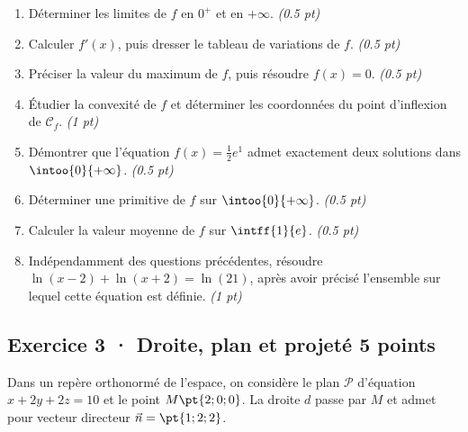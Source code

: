 \begin{enumerate}

\item Déterminer les limites de $f$ en $0^+$ et en $+\infty$. \hfill\textit{(\num{0,5} pt)}

\item Calculer $f' (x)$, puis dresser le tableau de variations de $f$. \hfill\textit{(\num{0,5} pt)}

\item Préciser la valeur du maximum de $f$, puis résoudre $f(x)=0$. \hfill\textit{(\num{0,5} pt)}

\item Étudier la convexité de $f$ et déterminer les coordonnées du point d'inflexion de $\mathcal C_f$. \hfill\textit{(1 pt)}

\item Démontrer que l'équation $f(x)=\frac12 e^{1}$ admet exactement deux solutions dans $\intoo{0}{+\infty}$. \hfill\textit{(\num{0,5} pt)}

\item Déterminer une primitive de $f$ sur $\intoo{0}{+\infty}$. \hfill\textit{(\num{0,5} pt)}

\item Calculer la valeur moyenne de $f$ sur $\intff{1}{e}$. \hfill\textit{(\num{0,5} pt)}

\item Indépendamment des questions précédentes, résoudre $\ln(x-2)+\ln(x+2)=\ln(21)$, après avoir précisé l'ensemble sur lequel cette équation est définie. \hfill\textit{(1 pt)}

\end{enumerate}

\mxnewpage{}

\subsection*{Exercice 3 · Droite, plan et projeté \hfill 5 points}Dans un repère orthonormé de l'espace, on considère le plan $\mathcal P$ d'équation $x+2y+2z=10$ et le point $M\pt{2;0;0}$. La droite $d$ passe par $M$ et admet pour vecteur directeur $\vec n=\pt{1;2;2}$.

